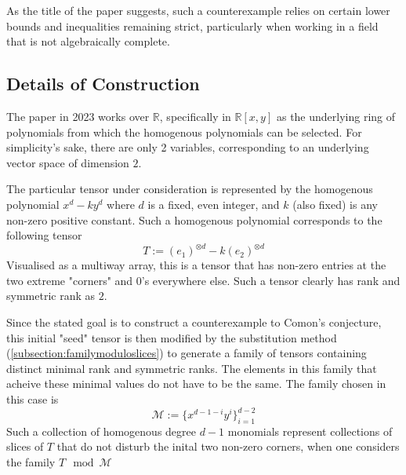 \documentclass[12pt,a4paper,oneside]{book}
\def\reals{\mathbb{R}} %
\theoremstyle{definition}
\begin{document}
As the title of the paper suggests, such a counterexample relies on certain lower bounds and inequalities remaining strict, particularly when working in a field that is not algebraically complete. 
\subsection{Details of Construction}\label{subsection:seigaldetails}
The paper in 2023 \cite{wang_lower_2023} works over $\reals$, specifically in $\reals[x,y]$ as the underlying ring of polynomials from which the homogenous polynomials can be selected. For simplicity's sake, there are only 2 variables, corresponding to an underlying vector space of dimension $2$. 

The particular tensor under consideration is represented by the homogenous polynomial $x^d - ky^d$ where $d$ is a fixed, even integer, and $k$ (also fixed) is any non-zero positive constant. Such a homogenous polynomial corresponds to the following tensor $$T:= (e_1)^{\otimes d} - k (e_2)^{\otimes d}$$
Visualised as a multiway array, this is a tensor that has non-zero entries at the two extreme "corners" and 0's everywhere else. Such a tensor clearly has rank and symmetric rank as $2$. 

Since the stated goal is to construct a counterexample to Comon's conjecture, this initial "seed" tensor is then modified by the substitution method (\cref{subsection:familymoduloslices}) to generate a family of tensors containing distinct minimal rank and symmetric ranks. The elements in this family that acheive these minimal values do not have to be the same. The family chosen in this case is $$\mathcal{M} := \{ x^{d-1-i}y^i \}_{i = 1}^{d-2}$$Such a collection of homogenous degree $d-1$ monomials represent collections of slices of $T$ that do not disturb the inital two non-zero corners, when one considers the family $T \mod \mathcal{M}$
\end{document}
